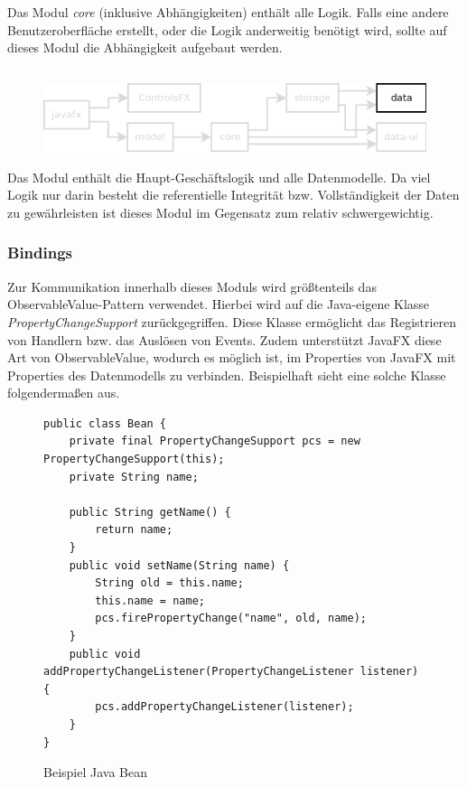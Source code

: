 Das Modul \textit{core} (inklusive Abhängigkeiten) enthält alle Logik. Falls eine andere Benutzeroberfläche erstellt,
oder die Logik anderweitig benötigt wird, sollte auf dieses Modul die Abhängigkeit aufgebaut werden.




\subsection{\textModData}
\label{\textModData}
\begin{figure}[H]
	\centering
	\includegraphics[width=.8\textwidth]{module_dependencies_data.png}
\end{figure}

Das Modul enthält die Haupt-Geschäftslogik und alle Datenmodelle. Da viel Logik nur darin besteht
die referentielle Integrität bzw. Vollständigkeit der Daten zu gewährleisten ist dieses Modul im Gegensatz zum
 relativ schwergewichtig.

\subsubsection{Bindings}
Zur Kommunikation innerhalb dieses Moduls wird größtenteils das ObservableValue-Pattern verwendet. Hierbei wird auf
die Java-eigene Klasse \textit{PropertyChangeSupport} zurückgegriffen. Diese Klasse ermöglicht das Registrieren
von Handlern bzw. das Auslösen von Events. Zudem unterstützt JavaFX diese Art von ObservableValue, wodurch es
möglich ist, im  Properties von JavaFX mit Properties des Datenmodells zu verbinden. Beispielhaft
sieht eine solche Klasse folgendermaßen aus.

\begin{figure}[H]
	\centering
	\begin{lstlisting}
public class Bean {
    private final PropertyChangeSupport pcs = new PropertyChangeSupport(this);
    private String name;

    public String getName() {
    	return name;
    }
    public void setName(String name) {
    	String old = this.name;
    	this.name = name;
    	pcs.firePropertyChange("name", old, name);
    }
    public void addPropertyChangeListener(PropertyChangeListener listener) {
    	pcs.addPropertyChangeListener(listener);
    }
}
	\end{lstlisting}
	\caption{Beispiel Java Bean}
\end{figure}

